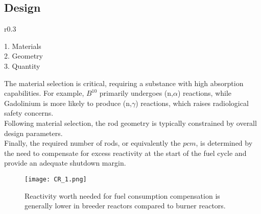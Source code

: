 \subsection{Design}
\begin{wrapfigure}{r}{0.3\textwidth}
    \begin{tcolorbox}[boxstyle, title=DESIGN STEPS]
        1. Materials \\
        2. Geometry \\
        3. Quantity
    \end{tcolorbox}
\end{wrapfigure} 
The material selection is critical, requiring a substance with high absorption capabilities. For example, $B^{10}$ primarily undergoes (n,$\alpha$) reactions, while Gadolinium is more likely to produce (n,$\gamma$) reactions, which raises radiological safety concerns. \\
Following material selection, the rod geometry is typically constrained by overall design parameters. \\
Finally, the required number of rods, or equivalently the $pcm$, is determined by the need to compensate for excess reactivity at the start of the fuel cycle and provide an adequate shutdown margin.

\begin{figure}[h]
    \centering
    \texttt{[image: CR\_1.png]}
    \caption{Reactivity worth needed for fuel consumption compensation is generally lower in breeder reactors compared to burner reactors.}
\end{figure}
